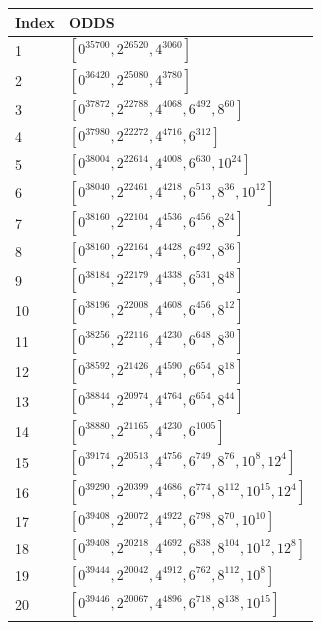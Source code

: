 \documentclass[10pt]{article}
\begin{document}
\begin{table}[h]
\begin{center}
\begin{tabular}{|l|l|}
\hline
Index & ODDS \\
\hline
1 & $\left[0^{35700}, 2^{26520}, 4^{3060}\right]$ \\
\hline
2 & $\left[0^{36420}, 2^{25080}, 4^{3780}\right]$ \\
\hline
3 & $\left[0^{37872}, 2^{22788}, 4^{4068}, 6^{492}, 8^{60}\right]$ \\
\hline
4 & $\left[0^{37980}, 2^{22272}, 4^{4716}, 6^{312}\right]$ \\
\hline
5 & $\left[0^{38004}, 2^{22614}, 4^{4008}, 6^{630}, 10^{24}\right]$ \\
\hline
6 & $\left[0^{38040}, 2^{22461}, 4^{4218}, 6^{513}, 8^{36}, 10^{12}\right]$ \\
\hline
7 & $\left[0^{38160}, 2^{22104}, 4^{4536}, 6^{456}, 8^{24}\right]$ \\
\hline
8 & $\left[0^{38160}, 2^{22164}, 4^{4428}, 6^{492}, 8^{36}\right]$ \\
\hline
9 & $\left[0^{38184}, 2^{22179}, 4^{4338}, 6^{531}, 8^{48}\right]$ \\
\hline
10 & $\left[0^{38196}, 2^{22008}, 4^{4608}, 6^{456}, 8^{12}\right]$ \\
\hline
11 & $\left[0^{38256}, 2^{22116}, 4^{4230}, 6^{648}, 8^{30}\right]$ \\
\hline
12 & $\left[0^{38592}, 2^{21426}, 4^{4590}, 6^{654}, 8^{18}\right]$ \\
\hline
13 & $\left[0^{38844}, 2^{20974}, 4^{4764}, 6^{654}, 8^{44}\right]$ \\
\hline
14 & $\left[0^{38880}, 2^{21165}, 4^{4230}, 6^{1005}\right]$ \\
\hline
15 & $\left[0^{39174}, 2^{20513}, 4^{4756}, 6^{749}, 8^{76}, 10^{8}, 12^{4}\right]$ \\
\hline
16 & $\left[0^{39290}, 2^{20399}, 4^{4686}, 6^{774}, 8^{112}, 10^{15}, 12^{4}\right]$ \\
\hline
17 & $\left[0^{39408}, 2^{20072}, 4^{4922}, 6^{798}, 8^{70}, 10^{10}\right]$ \\
\hline
18 & $\left[0^{39408}, 2^{20218}, 4^{4692}, 6^{838}, 8^{104}, 10^{12}, 12^{8}\right]$ \\
\hline
19 & $\left[0^{39444}, 2^{20042}, 4^{4912}, 6^{762}, 8^{112}, 10^{8}\right]$ \\
\hline
20 & $\left[0^{39446}, 2^{20067}, 4^{4896}, 6^{718}, 8^{138}, 10^{15}\right]$ \\

\end{tabular}
\end{center}
\end{table}
\end{document}
